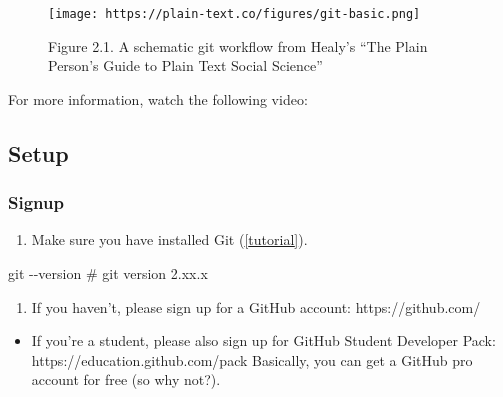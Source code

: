 \documentclass[
  letterpaper,
  DIV=11,
  numbers=noendperiod]{scrreprt}
\newenvironment{Shaded}{\begin{snugshade}}{\end{snugshade}}
\newcommand{\AttributeTok}[1]{\textcolor[rgb]{0.40,0.45,0.13}{#1}}
\newcommand{\CommentTok}[1]{\textcolor[rgb]{0.37,0.37,0.37}{#1}}
\newcommand{\FunctionTok}[1]{\textcolor[rgb]{0.28,0.35,0.67}{#1}}
\providecommand{\tightlist}{%
  \setlength{\itemsep}{0pt}\setlength{\parskip}{0pt}}\usepackage{longtable,booktabs,array}
\begin{document}
\begin{figure}

{\centering \texttt{[image: https://plain-text.co/figures/git-basic.png]}

}

\caption{Figure 2.1. A schematic git workflow from Healy's ``The Plain
Person's Guide to Plain Text Social Science''}

\end{figure}

For more information, watch the following video:

\hypertarget{setup}{%
\subsection*{Setup}\label{setup}}

\hypertarget{signup}{%
\subsubsection*{Signup}\label{signup}}

\begin{enumerate}
\def\labelenumi{\arabic{enumi}.}
\tightlist
\item
  Make sure you have installed Git
  (\href{https://happygitwithr.com/install-git.html\#install-git}{{[}tutorial{]}}).
\end{enumerate}

\begin{Shaded}
\begin{Highlighting}[]
\FunctionTok{git} \AttributeTok{{-}{-}version} 
\CommentTok{\# git version 2.xx.x}
\end{Highlighting}
\end{Shaded}

\begin{enumerate}
\def\labelenumi{\arabic{enumi}.}
\setcounter{enumi}{1}
\tightlist
\item
  If you haven't, please sign up for a GitHub account:
  https://github.com/
\end{enumerate}

\begin{itemize}
\tightlist
\item
  If you're a student, please also sign up for GitHub Student Developer
  Pack: https://education.github.com/pack Basically, you can get a
  GitHub pro account for free (so why not?).
\end{itemize}
\end{document}
